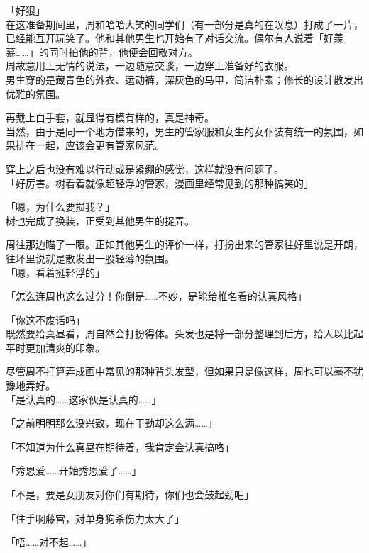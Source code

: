 「好狠」\\

在这准备期间里，周和哈哈大笑的同学们（有一部分是真的在叹息）打成了一片，已经能互开玩笑了。他和其他男生也开始有了对话交流。偶尔有人说着「好羡慕……」的同时拍他的背，他便会回敬对方。\\

周故意用上无情的说法，一边随意交谈，一边穿上准备好的衣服。\\

男生穿的是藏青色的外衣、运动裤，深灰色的马甲，简洁朴素；修长的设计散发出优雅的氛围。

再戴上白手套，就显得有模有样的，真是神奇。\\

当然，由于是同一个地方借来的，男生的管家服和女生的女仆装有统一的氛围，如果排在一起，应该会更有管家风范。

穿上之后也没有难以行动或是紧绷的感觉，这样就没有问题了。\\

「好厉害。树看着就像超轻浮的管家，漫画里经常见到的那种搞笑的」

「嗯，为什么要损我？」\\

树也完成了换装，正受到其他男生的捉弄。

周往那边瞄了一眼。正如其他男生的评价一样，打扮出来的管家往好里说是开朗，往坏里说就是散发出一股轻薄的氛围。\\

「嗯，看着挺轻浮的」

「怎么连周也这么过分！你倒是……不妙，是能给椎名看的认真风格」

「你这不废话吗」\\

既然要给真昼看，周自然会打扮得体。头发也是将一部分整理到后方，给人以比起平时更加清爽的印象。

尽管周不打算弄成画中常见的那种背头发型，但如果只是像这样，周也可以毫不犹豫地弄好。\\

「是认真的……这家伙是认真的……」

「之前明明那么没兴致，现在干劲却这么满……」

「不知道为什么真昼在期待着，我肯定会认真搞咯」

「秀恩爱……开始秀恩爱了……」

「不是，要是女朋友对你们有期待，你们也会鼓起劲吧」

「住手啊藤宫，对单身狗杀伤力太大了」

「唔……对不起……」

